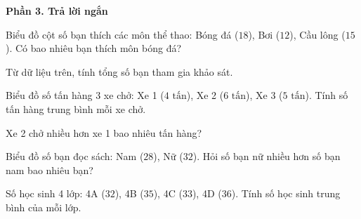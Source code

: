 \textbf{Phần 3. Trả lời ngắn}

\begin{ex} %
Biểu đồ cột số bạn thích các môn thể thao: Bóng đá ($18$), Bơi ($12$), Cầu lông ($15$). Có bao nhiêu bạn thích môn bóng đá?
\end{ex}

\begin{ex} %
Từ dữ liệu trên, tính tổng số bạn tham gia khảo sát.
\end{ex}

\begin{ex} %
Biểu đồ số tấn hàng 3 xe chở: Xe 1 ($4\text{ tấn}$), Xe 2 ($6\text{ tấn}$), Xe 3 ($5\text{ tấn}$). Tính số tấn hàng trung bình mỗi xe chở.
\end{ex}

\begin{ex} %
Xe 2 chở nhiều hơn xe 1 bao nhiêu tấn hàng?
\end{ex}

\begin{ex} %
Biểu đồ số bạn đọc sách: Nam ($28$), Nữ ($32$). Hỏi số bạn nữ nhiều hơn số bạn nam bao nhiêu bạn?
\end{ex}

\begin{ex} %
Số học sinh 4 lớp: 4A ($32$), 4B ($35$), 4C ($33$), 4D ($36$). Tính số học sinh trung bình của mỗi lớp.
\end{ex}
